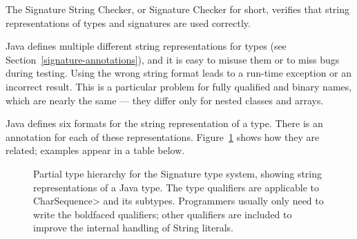 \htmlhr
{}

The Signature String Checker, or Signature Checker for short, verifies that
string representations of types and signatures are used correctly.

Java defines multiple different string representations for types (see
Section~\ref{signature-annotations}), and it is easy to
misuse them or to miss bugs during testing.  Using the wrong string format
leads to a run-time exception or an incorrect result.  This is a particular
problem for fully qualified and binary names, which are nearly the same ---
they differ only for nested classes and arrays.



Java defines six formats for the string representation of a type.
There is an annotation for each of these representations.
Figure~\ref{fig-signature-hierarchy} shows how they are related;
examples appear in a table below.

\begin{figure}
\caption{Partial type hierarchy for the Signature type system, showing
  string representations of a Java type.
  The type qualifiers are applicable to \<CharSequence> and its subtypes.
  Programmers usually only need to write
  the boldfaced qualifiers; other qualifiers are
  included to improve the internal handling of String literals.}
\label{fig-signature-hierarchy}
\end{figure}

\label{signature-annotations-descriptions}

